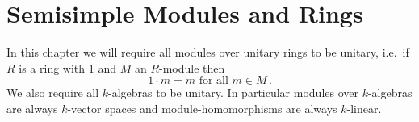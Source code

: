 \chapter{Semisimple Modules and Rings}


In this chapter we will require all modules over unitary rings to be unitary, i.e.\ if $R$ is a ring with $1$ and $M$ an $R$-module then
\[
    1 \cdot m
  = m
  \text{ for all }
  m \in M \,.
\]
We also require all $k$-algebras to be unitary.
In particular modules over $k$-algebras are always $k$-vector spaces and module-homomorphisms are always $k$-linear.















